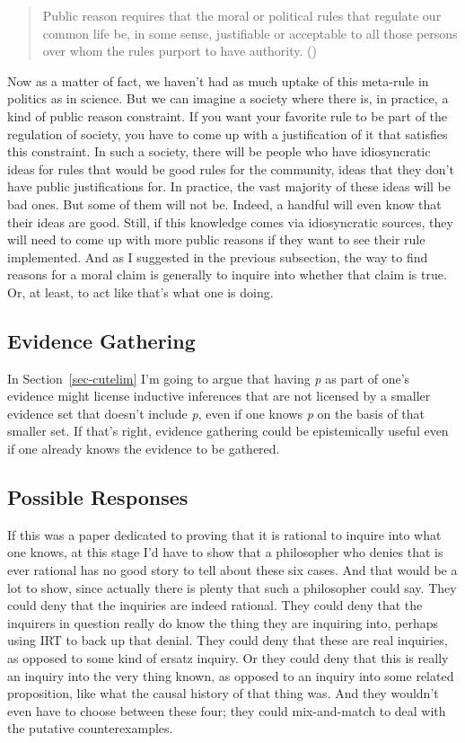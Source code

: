 \documentclass[
  12pt,
  letterpaper,
]{scrbook}
\begin{document}
\begin{quote}
Public reason requires that the moral or political rules that regulate
our common life be, in some sense, justifiable or acceptable to all
those persons over whom the rules purport to have authority.
()
\end{quote}

Now as a matter of fact, we haven't had as much uptake of this meta-rule
in politics as in science. But we can imagine a society where there is,
in practice, a kind of public reason constraint. If you want your
favorite rule to be part of the regulation of society, you have to come
up with a justification of it that satisfies this constraint. In such a
society, there will be people who have idiosyncratic ideas for rules
that would be good rules for the community, ideas that they don't have
public justifications for. In practice, the vast majority of these ideas
will be bad ones. But some of them will not be. Indeed, a handful will
even know that their ideas are good. Still, if this knowledge comes via
idiosyncratic sources, they will need to come up with more public
reasons if they want to see their rule implemented. And as I suggested
in the previous subsection, the way to find reasons for a moral claim is
generally to inquire into whether that claim is true. Or, at least, to
act like that's what one is doing.

\subsection{Evidence Gathering}\label{sec-evgather}

In Section~\ref{sec-cutelim} I'm going to argue that having \emph{p} as
part of one's evidence might license inductive inferences that are not
licensed by a smaller evidence set that doesn't include \emph{p}, even
if one knows \emph{p} on the basis of that smaller set. If that's right,
evidence gathering could be epistemically useful even if one already
knows the evidence to be gathered.

\subsection{Possible Responses}\label{sec-friedmaninquiry}

If this was a paper dedicated to proving that it is rational to inquire
into what one knows, at this stage I'd have to show that a philosopher
who denies that is ever rational has no good story to tell about these
six cases. And that would be a lot to show, since actually there is
plenty that such a philosopher could say. They could deny that the
inquiries are indeed rational. They could deny that the inquirers in
question really do know the thing they are inquiring into, perhaps using
IRT to back up that denial. They could deny that these are real
inquiries, as opposed to some kind of ersatz inquiry. Or they could deny
that this is really an inquiry into the very thing known, as opposed to
an inquiry into some related proposition, like what the causal history
of that thing was. And they wouldn't even have to choose between these
four; they could mix-and-match to deal with the putative
counterexamples.
\end{document}
